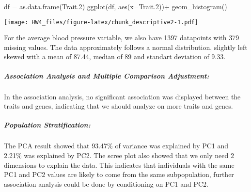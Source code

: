 \documentclass[
]{article}
\newenvironment{Shaded}{\begin{snugshade}}{\end{snugshade}}
\newcommand{\AttributeTok}[1]{\textcolor[rgb]{0.77,0.63,0.00}{#1}}
\newcommand{\FloatTok}[1]{\textcolor[rgb]{0.00,0.00,0.81}{#1}}
\newcommand{\FunctionTok}[1]{\textcolor[rgb]{0.00,0.00,0.00}{#1}}
\newcommand{\NormalTok}[1]{#1}
\newcommand{\OtherTok}[1]{\textcolor[rgb]{0.56,0.35,0.01}{#1}}
\newcommand{\SpecialCharTok}[1]{\textcolor[rgb]{0.00,0.00,0.00}{#1}}
\begin{document}
\begin{Shaded}
\begin{Highlighting}[]
\NormalTok{df }\OtherTok{=} \FunctionTok{as.data.frame}\NormalTok{(Trait}\FloatTok{.2}\NormalTok{)}
\FunctionTok{ggplot}\NormalTok{(df, }\FunctionTok{aes}\NormalTok{(}\AttributeTok{x=}\NormalTok{Trait}\FloatTok{.2}\NormalTok{))}\SpecialCharTok{+}
  \FunctionTok{geom\_histogram}\NormalTok{()}
\end{Highlighting}
\end{Shaded}

\texttt{[image: HW4\_files/figure-latex/chunk\_descriptive2-1.pdf]}

For the average blood pressure variable, we also have 1397 datapoints
with 379 missing values. The data approximately follows a normal
distribution, slightly left skewed with a mean of 87.44, median of 89
and standart deviation of 9.33.

\hypertarget{association-analysis-and-multiple-comparison-adjustment}{%
\subparagraph{Association Analysis and Multiple Comparison
Adjustment:}\label{association-analysis-and-multiple-comparison-adjustment}}

In the association analysis, no significant association was displayed
between the traits and genes, indicating that we should analyze on more
traits and genes.

\hypertarget{population-stratification}{%
\subparagraph{Population
Stratification:}\label{population-stratification}}

The PCA result showed that 93.47\% of variance was explained by PC1 and
2.21\% was explained by PC2. The scree plot also showed that we only
need 2 dimensions to explain the data. This indicates that individuals
with the same PC1 and PC2 values are likely to come from the same
subpopulation, further association analysis could be done by
conditioning on PC1 and PC2.
\end{document}
